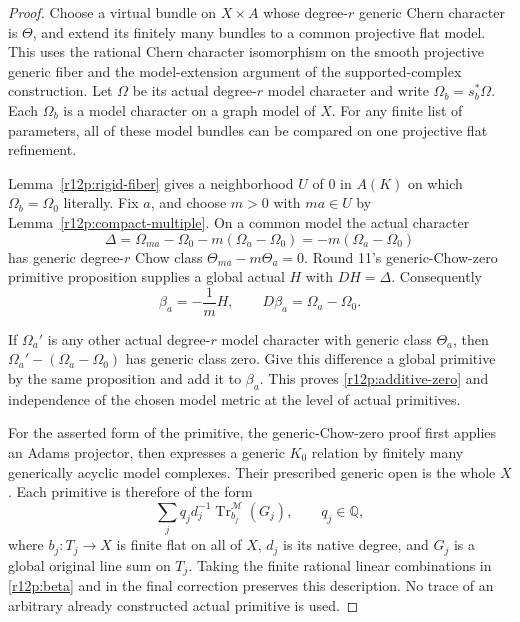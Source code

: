\begin{proof}
Choose a virtual bundle on $X\times A$ whose degree-$r$ generic
Chern character is $\Theta$, and extend its finitely many bundles
to a common projective flat model.  This uses the rational Chern
character isomorphism on the smooth projective generic fiber and
the model-extension argument of the supported-complex construction.
Let $\Omega$ be its actual degree-$r$ model character and write
$\Omega_b=s_b^*\Omega$.  Each $\Omega_b$ is a model character on a
graph model of $X$.  For any finite list of parameters, all of these
model bundles can be compared on one projective flat refinement.

Lemma~\ref{r12p:rigid-fiber} gives a neighborhood $U$ of $0$ in
$A(K)$ on which $\Omega_b=\Omega_0$ literally.  Fix $a$, and choose
$m>0$ with $ma\in U$ by Lemma~\ref{r12p:compact-multiple}.  On a
common model the actual character
\[
 \Delta=\Omega_{ma}-\Omega_0-m(\Omega_a-\Omega_0)
                 =-m(\Omega_a-\Omega_0)
\tag{R12.P5}\label{r12p:delta}
\]
has generic degree-$r$ Chow class
$\Theta_{ma}-m\Theta_a=0$.  Round 11's generic-Chow-zero primitive
proposition supplies a global actual $H$ with $DH=\Delta$.
Consequently
\[
                 \beta_a=-\frac{1}{m}H,
                 \qquad D\beta_a=\Omega_a-\Omega_0.
\tag{R12.P6}\label{r12p:beta}
\]

If $\Omega_a'$ is any other actual degree-$r$ model character with
generic class $\Theta_a$, then
$\Omega_a'-(\Omega_a-\Omega_0)$ has generic class zero.  Give this
difference a global primitive by the same proposition and add it to
$\beta_a$.  This proves \eqref{r12p:additive-zero} and independence
of the chosen model metric at the level of actual primitives.

For the asserted form of the primitive, the generic-Chow-zero proof
first applies an Adams projector, then expresses a generic $K_0$
relation by finitely many generically acyclic model complexes.
Their prescribed generic open is the whole $X$.  Each primitive is
therefore of the form
\[
       \sum_j q_jd_j^{-1}\operatorname{Tr}^{\mathscr M}_{b_j}(G_j),
       \qquad q_j\in\mathbb Q,
\tag{R12.P7}\label{r12p:certificate}
\]
where $b_j:T_j\to X$ is finite flat on all of $X$, $d_j$ is its
native degree, and $G_j$ is a global original line sum on $T_j$.
Taking the finite rational linear combinations in
\eqref{r12p:beta} and in the final correction preserves this
description.  No trace of an arbitrary already constructed actual
primitive is used.
\end{proof}

